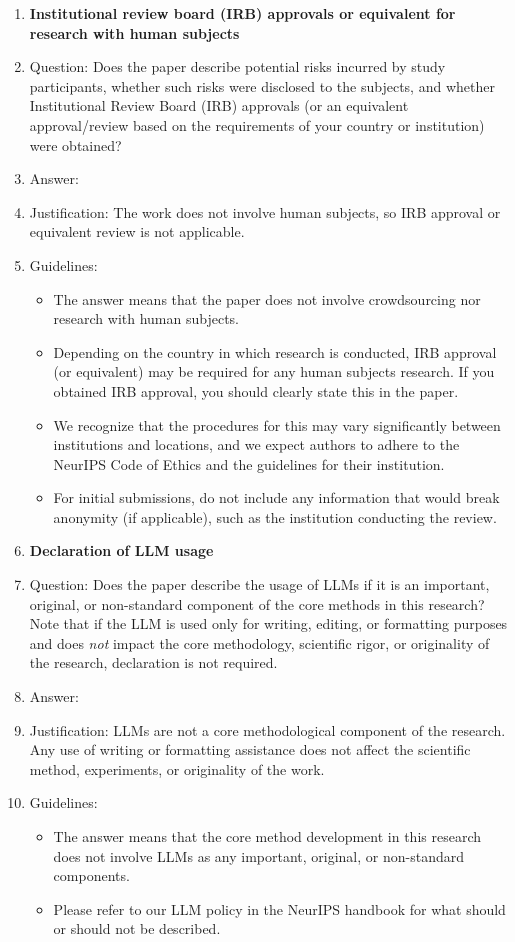 \begin{enumerate}
\item {\bf Institutional review board (IRB) approvals or equivalent for research with human subjects}
    \item[] Question: Does the paper describe potential risks incurred by study participants, whether such risks were disclosed to the subjects, and whether Institutional Review Board (IRB) approvals (or an equivalent approval/review based on the requirements of your country or institution) were obtained?
    \item[] Answer: \answerNA{}
    \item[] Justification: The work does not involve human subjects, so IRB approval or equivalent review is not applicable.
    \item[] Guidelines:
    \begin{itemize}
        \item The answer \answerNA{} means that the paper does not involve crowdsourcing nor research with human subjects.
        \item Depending on the country in which research is conducted, IRB approval (or equivalent) may be required for any human subjects research. If you obtained IRB approval, you should clearly state this in the paper. 
        \item We recognize that the procedures for this may vary significantly between institutions and locations, and we expect authors to adhere to the NeurIPS Code of Ethics and the guidelines for their institution. 
        \item For initial submissions, do not include any information that would break anonymity (if applicable), such as the institution conducting the review.
    \end{itemize}

\item {\bf Declaration of LLM usage}
    \item[] Question: Does the paper describe the usage of LLMs if it is an important, original, or non-standard component of the core methods in this research? Note that if the LLM is used only for writing, editing, or formatting purposes and does \emph{not} impact the core methodology, scientific rigor, or originality of the research, declaration is not required.
    \item[] Answer: \answerNA{}
    \item[] Justification: LLMs are not a core methodological component of the research. Any use of writing or formatting assistance does not affect the scientific method, experiments, or originality of the work.
    \item[] Guidelines:
    \begin{itemize}
        \item The answer \answerNA{} means that the core method development in this research does not involve LLMs as any important, original, or non-standard components.
        \item Please refer to our LLM policy in the NeurIPS handbook for what should or should not be described.
    \end{itemize}

\end{enumerate}
